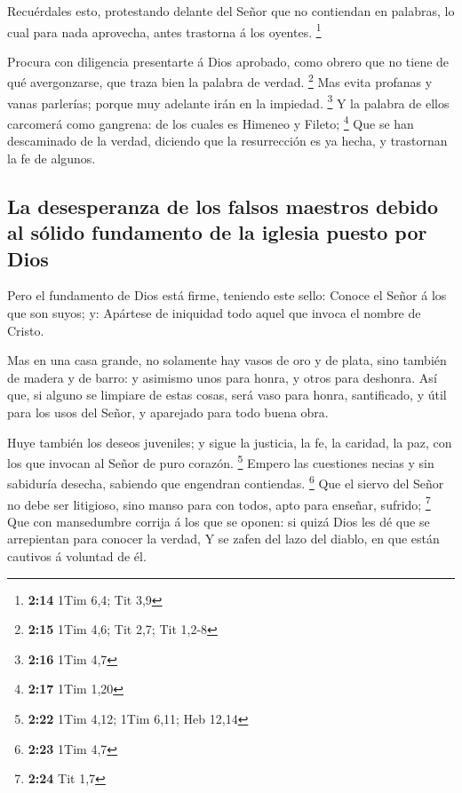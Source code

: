 Recuérdales esto, protestando delante del Señor que no
contiendan en palabras, lo cual para nada aprovecha, antes trastorna á
los oyentes. \footnote{\textbf{2:14} 1Tim 6,4; Tit 3,9}

 Procura con diligencia presentarte á Dios aprobado, como
obrero que no tiene de qué avergonzarse, que traza bien la palabra de
verdad. \footnote{\textbf{2:15} 1Tim 4,6; Tit 2,7; Tit 1,2-8}
 Mas evita profanas y vanas parlerías; porque muy
adelante irán en la impiedad. \footnote{\textbf{2:16} 1Tim 4,7}
 Y la palabra de ellos carcomerá como gangrena: de los
cuales es Himeneo y Fileto; \footnote{\textbf{2:17} 1Tim 1,20}
 Que se han descaminado de la verdad, diciendo que la
resurrección es ya hecha, y trastornan la fe de algunos.

\hypertarget{la-desesperanza-de-los-falsos-maestros-debido-al-suxf3lido-fundamento-de-la-iglesia-puesto-por-dios}{%
\subsection{La desesperanza de los falsos maestros debido al sólido
fundamento de la iglesia puesto por
Dios}\label{la-desesperanza-de-los-falsos-maestros-debido-al-suxf3lido-fundamento-de-la-iglesia-puesto-por-dios}}

 Pero el fundamento de Dios está firme, teniendo este
sello: Conoce el Señor á los que son suyos; y: Apártese de iniquidad
todo aquel que invoca el nombre de Cristo.

 Mas en una casa grande, no solamente hay vasos de oro y
de plata, sino también de madera y de barro: y asimismo unos para honra,
y otros para deshonra.  Así que, si alguno se limpiare de
estas cosas, será vaso para honra, santificado, y útil para los usos del
Señor, y aparejado para todo buena obra.

 Huye también los deseos juveniles; y sigue la justicia,
la fe, la caridad, la paz, con los que invocan al Señor de puro corazón.
\footnote{\textbf{2:22} 1Tim 4,12; 1Tim 6,11; Heb 12,14} 
Empero las cuestiones necias y sin sabiduría desecha, sabiendo que
engendran contiendas. \footnote{\textbf{2:23} 1Tim 4,7} 
Que el siervo del Señor no debe ser litigioso, sino manso para con
todos, apto para enseñar, sufrido; \footnote{\textbf{2:24} Tit 1,7}
 Que con mansedumbre corrija á los que se oponen: si
quizá Dios les dé que se arrepientan para conocer la verdad,
 Y se zafen del lazo del diablo, en que están cautivos á
voluntad de él.

